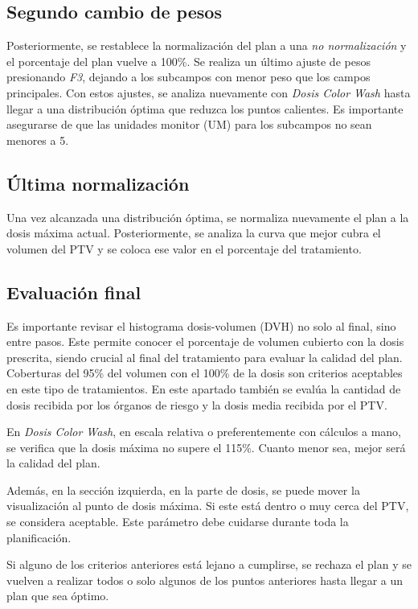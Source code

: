 \documentclass{article}
\begin{document}
\subsection*{Segundo cambio de pesos}

Posteriormente, se restablece la normalización del plan a una \textit{no normalización} y el porcentaje del plan vuelve a 100\%. Se realiza un último ajuste de pesos presionando \textit{F3}, dejando a los subcampos con menor peso que los campos principales. Con estos ajustes, se analiza nuevamente con \textit{Dosis Color Wash} hasta llegar a una distribución óptima que reduzca los puntos calientes. Es importante asegurarse de que las unidades monitor (UM) para los subcampos no sean menores a 5.

\subsection*{Última normalización}

Una vez alcanzada una distribución óptima, se normaliza nuevamente el plan a la dosis máxima actual. Posteriormente, se analiza la curva que mejor cubra el volumen del PTV y se coloca ese valor en el porcentaje del tratamiento.

\subsection*{Evaluación final}

Es importante revisar el histograma dosis-volumen (DVH) no solo al final, sino entre pasos. Este permite conocer el porcentaje de volumen cubierto con la dosis prescrita, siendo crucial al final del tratamiento para evaluar la calidad del plan. Coberturas del 95\% del volumen con el 100\% de la dosis son criterios aceptables en este tipo de tratamientos. En este apartado también se evalúa la cantidad de dosis recibida por los órganos de riesgo y la dosis media recibida por el PTV.

En \textit{Dosis Color Wash}, en escala relativa o preferentemente con cálculos a mano, se verifica que la dosis máxima no supere el 115\%. Cuanto menor sea, mejor será la calidad del plan.

Además, en la sección izquierda, en la parte de dosis, se puede mover la visualización al punto de dosis máxima. Si este está dentro o muy cerca del PTV, se considera aceptable. Este parámetro debe cuidarse durante toda la planificación.

Si alguno de los criterios anteriores está lejano a cumplirse, se rechaza el plan y se vuelven a realizar todos o solo algunos de los puntos anteriores hasta llegar a un plan que sea óptimo.
\end{document}
